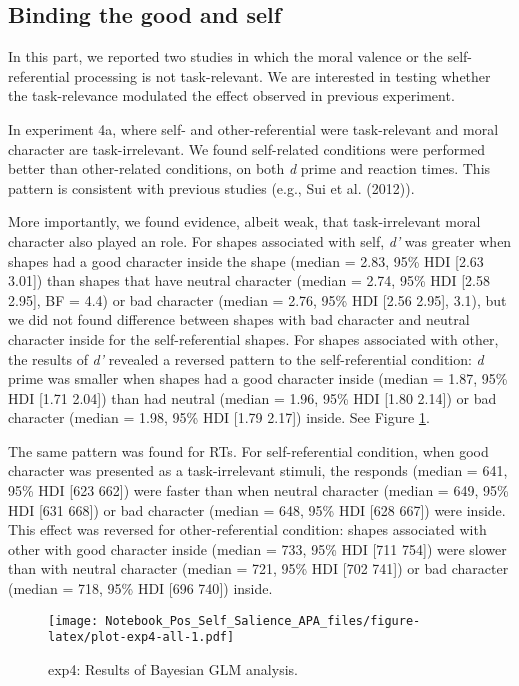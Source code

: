 \documentclass[
  man]{apa6}
\begin{document}
\hypertarget{binding-the-good-and-self}{%
\subsection{Binding the good and self}\label{binding-the-good-and-self}}

In this part, we reported two studies in which the moral valence or the self-referential processing is not task-relevant. We are interested in testing whether the task-relevance modulated the effect observed in previous experiment.

In experiment 4a, where self- and other-referential were task-relevant and moral character are task-irrelevant. We found self-related conditions were performed better than other-related conditions, on both \emph{d} prime and reaction times. This pattern is consistent with previous studies (e.g., Sui et al. (2012)).

More importantly, we found evidence, albeit weak, that task-irrelevant moral character also played an role. For shapes associated with self, \emph{d'} was greater when shapes had a good character inside the shape (median = 2.83, 95\% HDI {[}2.63 3.01{]}) than shapes that have neutral character (median = 2.74, 95\% HDI {[}2.58 2.95{]}, BF = 4.4) or bad character (median = 2.76, 95\% HDI {[}2.56 2.95{]}, 3.1), but we did not found difference between shapes with bad character and neutral character inside for the self-referential shapes. For shapes associated with other, the results of \emph{d'} revealed a reversed pattern to the self-referential condition: \emph{d} prime was smaller when shapes had a good character inside (median = 1.87, 95\% HDI {[}1.71 2.04{]}) than had neutral (median = 1.96, 95\% HDI {[}1.80 2.14{]}) or bad character (median = 1.98, 95\% HDI {[}1.79 2.17{]}) inside. See Figure \ref{fig:plot-exp4-all}.

The same pattern was found for RTs. For self-referential condition, when good character was presented as a task-irrelevant stimuli, the responds (median = 641, 95\% HDI {[}623 662{]}) were faster than when neutral character (median = 649, 95\% HDI {[}631 668{]}) or bad character (median = 648, 95\% HDI {[}628 667{]}) were inside. This effect was reversed for other-referential condition: shapes associated with other with good character inside (median = 733, 95\% HDI {[}711 754{]}) were slower than with neutral character (median = 721, 95\% HDI {[}702 741{]}) or bad character (median = 718, 95\% HDI {[}696 740{]}) inside.

\begin{figure}
\centering
\texttt{[image: Notebook\_Pos\_Self\_Salience\_APA\_files/figure-latex/plot-exp4-all-1.pdf]}
\caption{\label{fig:plot-exp4-all}exp4: Results of Bayesian GLM analysis.}
\end{figure}
\end{document}
